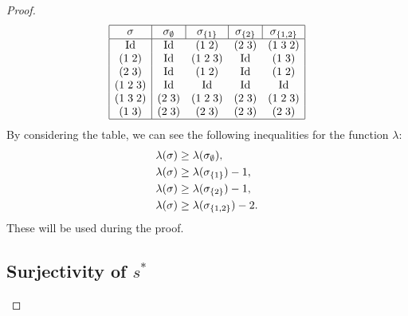 \begin{proof}
  \[
  \begin{array}{|c|cccc|}
    \hline
    \sigma & \multicolumn{1}{c|}{\sigma_\emptyset} 
    & \multicolumn{1}{c|}{\sigma_{\set{1}}} 
    & \multicolumn{1}{c|}{\sigma_{\set{2}}} & \sigma_{\set{1,2}} \\
    \hline
    \Id & \Id & (1\;2) & (2\;3) & (1\;3\;2) \\
    (1\;2) & \Id & (1\;2\;3) & \Id & (1\;3) \\
    (2\;3) & \Id & (1\;2) & \Id & (1\;2) \\
    (1\;2\;3) & \Id & \Id & \Id & \Id \\
    (1\;3\;2) & (2\;3) & (1\;2\;3) & (2\;3) & (1\;2\;3) \\
    (1\;3) & (2\; 3) & (2\;3) & (2\;3) & (2\;3) \\
    \hline
  \end{array}
  \]
  By considering the table, we can see the following inequalities for
  the function $\lambda$:
  \begin{align*}
    \lambda(\sigma) &\geq \lambda(\sigma_{\emptyset}), \\
    \lambda(\sigma) &\geq \lambda(\sigma_{\left\{ 1 \right\}}) - 1, \\
    \lambda(\sigma) &\geq \lambda(\sigma_{\left\{ 2 \right\}}) - 1, \\
    \lambda(\sigma) &\geq \lambda(\sigma_{\left\{ 1,2 \right\}}) - 2. \\
  \end{align*}
  These will be used during the proof.
  
  
  
  \subsection{Surjectivity of $s^*$}
  

\end{proof}
